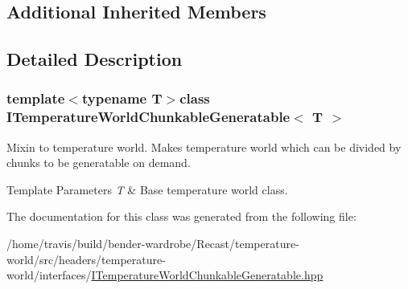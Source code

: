 \subsection*{Additional Inherited Members}


\subsection{Detailed Description}
\subsubsection*{template$<$typename T$>$class I\-Temperature\-World\-Chunkable\-Generatable$<$ T $>$}

Mixin to temperature world. Makes temperature world which can be divided by chunks to be generatable on demand.


\begin{DoxyTemplParams}{Template Parameters}
{\em T} & Base temperature world class. \\
\hline
\end{DoxyTemplParams}


The documentation for this class was generated from the following file\-:\begin{DoxyCompactItemize}
\item 
/home/travis/build/bender-\/wardrobe/\-Recast/temperature-\/world/src/headers/temperature-\/world/interfaces/\hyperlink{_i_temperature_world_chunkable_generatable_8hpp}{I\-Temperature\-World\-Chunkable\-Generatable.\-hpp}\end{DoxyCompactItemize}
